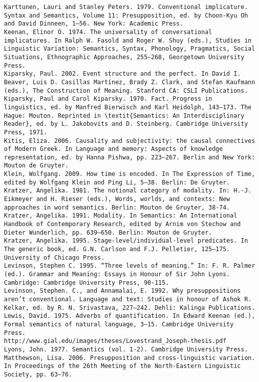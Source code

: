 \begin{verbatim}
Karttunen, Lauri and Stanley Peters. 1979. Conventional implicature. Syntax and Semantics, Volume 11: Presupposition, ed. by Choon-Kyu Oh and David Dinneen, 1–56. New York: Academic Press.
Keenan, Elinor O. 1974. The universality of conversational implicatures. In Ralph W. Fasold and Roger W. Shuy (eds.), Studies in Linguistic Variation: Semantics, Syntax, Phonology, Pragmatics, Social Situations, Ethnographic Approaches, 255–268, Georgetown University Press.
Kiparsky, Paul. 2002. Event structure and the perfect. In David I. Beaver, Luis D. Casillas Martínez, Brady Z. Clark, and Stefan Kaufmann (eds.), The Construction of Meaning. Stanford CA: CSLI Publications.
Kiparsky, Paul and Carol Kiparsky. 1970. Fact. Progress in linguistics, ed. by Manfred Bierwisch and Karl Heidolph, 143–173. The Hague: Mouton. Reprinted in \textit{Semantics: An Interdisciplinary Reader}, ed. by L. Jakobovits and D. Steinberg. Cambridge University Press, 1971.
Kitis, Eliza. 2006. Causality and subjectivity: the causal connectives of Modern Greek. In Language and memory: Aspects of knowledge representation, ed. by Hanna Pishwa, pp. 223–267. Berlin and New York: Mouton de Gruyter.
Klein, Wolfgang. 2009. How time is encoded. In The Expression of Time, edited by Wolfgang Klein and Ping Li, 5–38. Berlin: De Gruyter.
Kratzer, Angelika. 1981. The notional category of modality. In: H.-J. Eikmeyer and H. Rieser (eds.), Words, worlds, and contexts: New approaches in word semantics. Berlin: Mouton de Gruyter, 38-74.
Kratzer, Angelika. 1991. Modality. In Semantics: An International Handbook of Contemporary Research, edited by Arnim von Stechow and Dieter Wunderlich, pp. 639–650. Berlin: Mouton de Gruyter.
Kratzer, Angelika. 1995. Stage-level/individual-level predicates. In The generic book, ed. G.N. Carlson and F.J. Pelletier, 125–175. University of Chicago Press.
Levinson, Stephen C. 1995. “Three levels of meaning.” In: F. R. Palmer (ed.). Grammar and Meaning: Essays in Honour of Sir John Lyons. Cambridge: Cambridge University Press, 90-115.
Levinson, Stephen. C., and Annamalai, E. 1992. Why presuppositions aren’t conventional. Language and text: Studies in honour of Ashok R. Kelkar, ed. by R. N. Srivastava, 227–242. Dehli: Kalinga Publications.
Lewis, David. 1975. Adverbs of quantification. In Edward Keenan (ed.), Formal semantics of natural language, 3–15. Cambridge University Press.
http://www.gial.edu/images/theses/Lovestrand_Joseph-thesis.pdf
Lyons, John. 1977. Semantics (vol. 1-2). Cambridge University Press.
Matthewson, Lisa. 2006. Presupposition and cross-linguistic variation. In Proceedings of the 26th Meeting of the North-Eastern Linguistic Society, pp. 63–76.

\end{verbatim}
